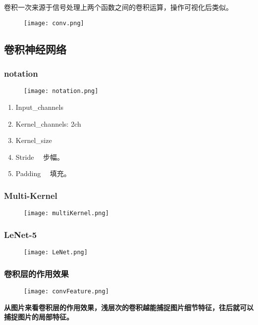 卷积一次来源于信号处理上两个函数之间的卷积运算，操作可视化后类似。
\begin{figure}[!h]
  \centering
  \texttt{[image: conv.png]}
\end{figure}


\subsection{卷积神经网络}
\subsubsection{notation}
\begin{figure}[!h]
  \centering
  \texttt{[image: notation.png]}
\end{figure}
\begin{enumerate}
  \item Input\_channels
  \item Kernel\_channels: 2ch
  \item Kernel\_size
  \item Stride  ~~步幅。
  \item Padding  ~~填充。
\end{enumerate}

\subsubsection{Multi-Kernel}
\begin{figure}[!h]
  \centering
  \texttt{[image: multiKernel.png]}
\end{figure}

\subsubsection{LeNet-5}
\begin{figure}[!h]
  \centering
  \texttt{[image: LeNet.png]}
\end{figure}

\subsubsection{卷积层的作用效果}
\begin{figure}[!h]
  \centering
  \texttt{[image: convFeature.png]}
\end{figure}

\textbf{从图片来看卷积层的作用效果，浅层次的卷积越能捕捉图片细节特征，往后就可以捕捉图片的局部特征。}

